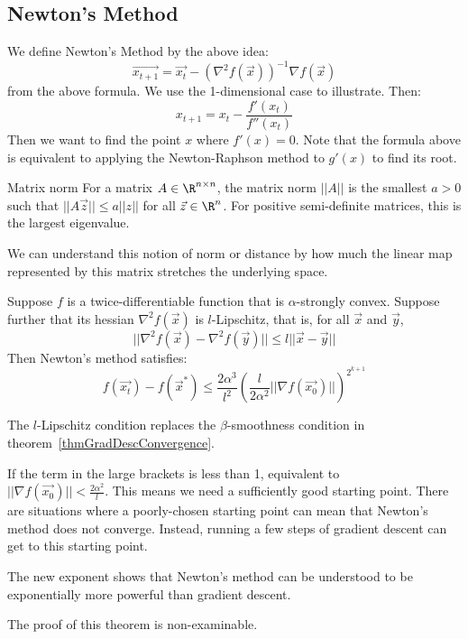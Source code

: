 \documentclass[../Main.tex]{subfiles}
\begin{document}
\subsection{Newton's Method}
We define Newton's Method by the above idea:
\begin{equation*}
    \vec{x_{t+1}} = \vec{x_t} - \left(\nabla^2 f(\vec{x})\right)^{-1} \nabla f(\vec{x})
\end{equation*}
from the above formula. We use the 1-dimensional case to illustrate. Then:
\begin{equation*}
    x_{t+1} = x_t - \frac{f'(x_t)}{f''(x_t)}
\end{equation*}
Then we want to find the point $x$ where $f'(x) = 0$. Note that the formula above is equivalent to applying the Newton-Raphson method to $g'(x)$ to find its root.
\begin{definition}{Matrix norm}
    For a matrix $A \in \R^{n \times n}$, the matrix norm $||A||$ is the smallest $a > 0$ such that $||A\vec{z}|| \leq a ||z||$ for all $\vec{z} \in \R^n$. For positive semi-definite matrices, this is the largest eigenvalue.
\end{definition}
\begin{remark}
    We can understand this notion of norm or distance by how much the linear map represented by this matrix stretches the underlying space.
\end{remark}
\begin{theorem}
    Suppose $f$ is a twice-differentiable function that is $\alpha$-strongly convex. Suppose further that its hessian $\nabla^2 f(\vec{x})$ is $l$-Lipschitz, that is, for all $\vec{x}$ and $\vec{y}$,
    \begin{equation*}
        ||\nabla^2 f(\vec{x}) - \nabla^2 f(\vec{y})|| \leq l||\vec{x} - \vec{y}||
    \end{equation*}
    Then Newton's method satisfies:
    \begin{equation*}
        f(\vec{x_t}) - f(\vec{x}^*) \leq \frac{2\alpha^3}{l^2} \left(\frac{l}{2\alpha^2} ||\nabla f(\vec{x_0})||\right)^{2^{k+1}}
    \end{equation*}
\end{theorem}
\begin{remarks}
    \item The $l$-Lipschitz condition replaces the $\beta$-smoothness condition in theorem~\ref{thmGradDescConvergence}.
    \item If the term in the large brackets is less than 1, equivalent to\\$||\nabla f(\vec{x_0})|| < \frac{2\alpha^2}{l}$. This means we need a sufficiently good starting point. There are situations where a poorly-chosen starting point can mean that Newton's method does not converge. Instead, running a few steps of gradient descent can get to this starting point.
    \item The new exponent shows that Newton's method can be understood to be exponentially more powerful than gradient descent.
    \item The proof of this theorem is non-examinable.
\end{remarks}
\end{document}
